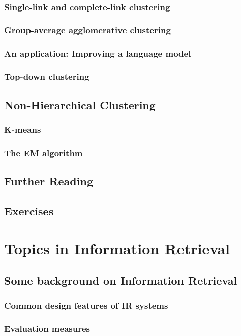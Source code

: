 \documentclass[a4paper]{article}
\begin{document}
\subsubsection{Single-link and complete-link clustering}
\subsubsection{Group-average agglomerative clustering}
\subsubsection{An application: Improving a language model}
\subsubsection{Top-down clustering}
\subsection{Non-Hierarchical Clustering}
\subsubsection{K-means}
\subsubsection{The EM algorithm}
\subsection{Further Reading}
\subsection{Exercises}
\newpage
\section{Topics in Information Retrieval}
\subsection{Some background on Information Retrieval}
\subsubsection{Common design features of IR systems}
\subsubsection{Evaluation measures}
\end{document}
